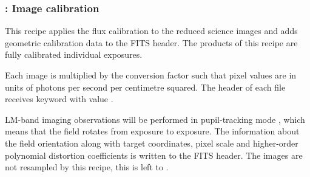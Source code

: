 \clearpage
\subsubsection{:  Image calibration}
\label{lm_img_calibrate}
\label{rec:metis_lm_img_calibrate}
\label{rec:lm_img_calibrate}
\label{sssec:lm_img_calibrate}

This recipe applies the flux calibration to the reduced science
images and adds geometric calibration data to the FITS header. The
products of this recipe are fully calibrated individual exposures.

Each image is multiplied by the conversion factor such that pixel
values are in units of photons per second per centimetre squared. The
header of each file receives keyword  with value %
.


LM-band imaging observations will be performed in pupil-tracking mode
\cite{METIS-operational_concept}, which means that the field rotates
from exposure to exposure.  The information about the field
orientation along with target coordinates, pixel scale and
higher-order polynomial distortion coefficients is written to the FITS
header. The images are not resampled by this recipe, this is left to
 .



